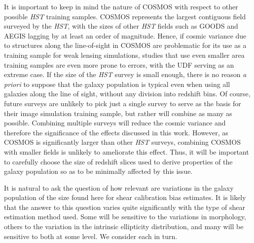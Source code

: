 \documentclass[twocolumn,useAMS,usenatbib]{mn2e}
\begin{document}
It is important to keep in mind the nature of COSMOS with respect to
other possible {\em HST} training samples.  COSMOS represents the
largest contiguous field surveyed by the {\em HST}, with the sizes of
other {\em HST} fields such as GOODS and AEGIS lagging by at least an
order of magnitude.  Hence, if cosmic variance due to structures along
the line-of-sight in COSMOS are problematic for its use as a training
sample for weak lensing simulations, studies that use even smaller
area training samples are even more prone to errors, with the UDF
serving as an extreme case.  If the size of the {\em HST} survey is
small enough, there is no reason {\em a priori} to suppose that the
galaxy population is typical even when using all galaxies along the
line of sight, without any division into redshift bins.  Of course,
future surveys are unlikely to pick just a single survey to serve as
the basis for their image simulation training sample, but rather
will combine as many as possible.  Combining multiple surveys will
reduce the cosmic variance and therefore the significance of the
effects discussed in this work.
However, as COSMOS is significantly larger than other \emph{HST} surveys, combining COSMOS with smaller fields is unlikely to ameliorate this effect.
Thus, it will be important to carefully choose the size of redshift slices used to
derive properties of the galaxy population so as to be minimally
affected by this issue.

It is natural to ask the question of how relevant are variations in
the galaxy population of the size found here for shear calibration
bias estimates.  It is likely that the answer to this question varies
quite significantly with the type of shear estimation method used.
Some will be sensitive to the variations in morphology, others to the
variation in the intrinsic ellipticity distribution, and many will be
sensitive to both at some level.  We consider each in turn.
\end{document}
